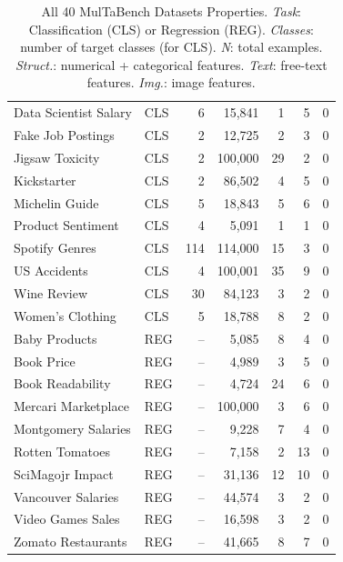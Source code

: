 \documentclass{llmxive}
\begin{document}
\begin{table}
\begin{tabular}{llrrrrr}
Data Scientist Salary     & CLS &   6 & 15,841  &  1  &  5 & 0 \\
Fake Job Postings         & CLS &  2 & 12,725  &  2  &  3 & 0 \\
Jigsaw Toxicity           & CLS &  2 & 100,000 & 29  &  2 & 0 \\
Kickstarter               & CLS &  2 & 86,502  &  4  &  5 & 0 \\
Michelin Guide            & CLS &   5 & 18,843  &  5  &  6 & 0 \\
Product Sentiment         & CLS &   4 &  5,091  &  1  &  1 & 0 \\
Spotify Genres            & CLS & 114 & 114,000 & 15  &  3 & 0 \\
US Accidents              & CLS &   4 & 100,001 & 35  &  9 & 0 \\
Wine Review               & CLS &  30 & 84,123  &  3  &  2 & 0 \\
Women's Clothing          & CLS &   5 & 18,788  &  8  &  2 & 0 \\
Baby Products             & REG &  -- &  5,085  &  8  &  4 & 0 \\
Book Price                & REG &  -- &  4,989  &  3  &  5 & 0 \\
Book Readability          & REG &  -- &  4,724  & 24  &  6 & 0 \\
Mercari Marketplace       & REG &  -- & 100,000 &  3  &  6 & 0 \\
Montgomery Salaries       & REG &  -- &  9,228  &  7  &  4 & 0 \\
Rotten Tomatoes           & REG &  -- &  7,158  &  2  & 13 & 0 \\
SciMagojr Impact          & REG &  -- & 31,136  & 12  & 10 & 0 \\
Vancouver Salaries        & REG &  -- & 44,574  &  3  &  2 & 0 \\
Video Games Sales         & REG &  -- & 16,598  &  3  &  2 & 0 \\
Zomato Restaurants        & REG &  -- & 41,665  &  8  &  7 & 0 \\
\bottomrule
\end{tabular}
\caption{All 40 MulTaBench Datasets Properties. \textit{Task}: Classification (CLS) or Regression (REG). \textit{Classes}: number of target classes (for CLS). \textit{N}: total examples. \textit{Struct.}: numerical + categorical features. \textit{Text}: free-text features. \textit{Img.}: image features.}
\label{tab:multabench_datasets}
\end{table}
\end{document}
